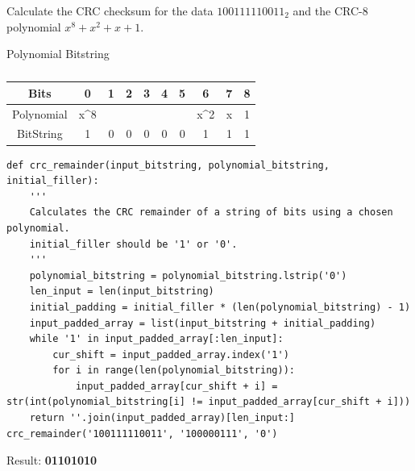 \documentclass[12pt,addpoints,answers]{exam}
\begin{document}
\begin{questions}
\question[8] Calculate the CRC checksum for the data $100111110011_2$ and the CRC-8 polynomial $x^8 + x^2 + x + 1$.
\begin{solution}
	Polynomial Bitstring
\begin{table}[H]
	\centering
	\caption{}
	\label{tab:my-table}
	\begin{tabular}{|c|ccccccccc}
		\hline
		Bits &
		\multicolumn{1}{c|}{0} &
		\multicolumn{1}{c|}{1} &
		\multicolumn{1}{c|}{2} &
		\multicolumn{1}{c|}{3} &
		\multicolumn{1}{c|}{4} &
		\multicolumn{1}{c|}{5} &
		\multicolumn{1}{c|}{6} &
		\multicolumn{1}{c|}{7} &
		\multicolumn{1}{c|}{8} \\ \hline
		Polynomial &
		x\textasciicircum{}8 &
		&
		&
		&
		&
		&
		x\textasciicircum{}2 &
		x &
		1 \\ \cline{1-1}
		BitString &
		1 &
		0 &
		0 &
		0 &
		0 &
		0 &
		1 &
		1 &
		1 \\ \cline{1-1}
	\end{tabular}
\end{table}
\begin{lstlisting}
def crc_remainder(input_bitstring, polynomial_bitstring, initial_filler):
	'''
	Calculates the CRC remainder of a string of bits using a chosen polynomial.
	initial_filler should be '1' or '0'.
	'''
	polynomial_bitstring = polynomial_bitstring.lstrip('0')
	len_input = len(input_bitstring)
	initial_padding = initial_filler * (len(polynomial_bitstring) - 1)
	input_padded_array = list(input_bitstring + initial_padding)
	while '1' in input_padded_array[:len_input]:
		cur_shift = input_padded_array.index('1')
		for i in range(len(polynomial_bitstring)):
			input_padded_array[cur_shift + i] = str(int(polynomial_bitstring[i] != input_padded_array[cur_shift + i]))
	return ''.join(input_padded_array)[len_input:]
crc_remainder('100111110011', '100000111', '0')
\end{lstlisting}

Result: \textbf{01101010}
\end{solution}


\end{questions}
\end{document}
